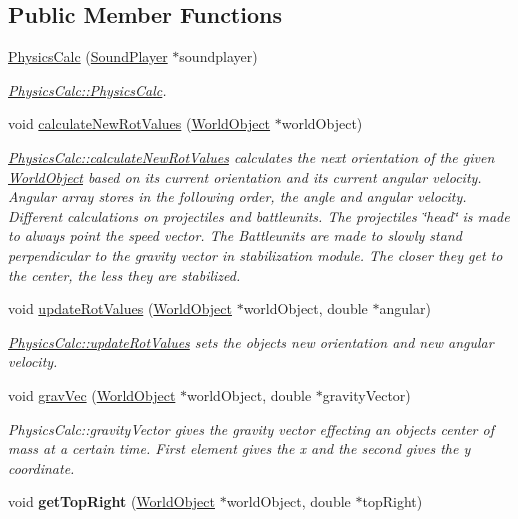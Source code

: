 \subsection*{Public Member Functions}
\begin{DoxyCompactItemize}
\item 
\hyperlink{class_physics_calc_a806b2675198437e8271ab82eda0e6746}{Physics\+Calc} (\hyperlink{class_sound_player}{Sound\+Player} $\ast$soundplayer)
\begin{DoxyCompactList}\small\item\em \hyperlink{class_physics_calc_a806b2675198437e8271ab82eda0e6746}{Physics\+Calc\+::\+Physics\+Calc}. \end{DoxyCompactList}\item 
void \hyperlink{class_physics_calc_a7ef2a6c520d3d0a815c333c1a08cb4df}{calculate\+New\+Rot\+Values} (\hyperlink{class_world_object}{World\+Object} $\ast$world\+Object)
\begin{DoxyCompactList}\small\item\em \hyperlink{class_physics_calc_a7ef2a6c520d3d0a815c333c1a08cb4df}{Physics\+Calc\+::calculate\+New\+Rot\+Values} calculates the next orientation of the given \hyperlink{class_world_object}{World\+Object} based on it\textquotesingle{}s current orientation and its current angular velocity. Angular array stores in the following order, the angle and angular velocity. Different calculations on projectiles and battleunits. The projectiles \char`\"{}head\char`\"{} is made to always point the speed vector. The Battleunits are made to slowly stand perpendicular to the gravity vector in stabilization module. The closer they get to the center, the less they are stabilized. \end{DoxyCompactList}\item 
void \hyperlink{class_physics_calc_afaa9837f796074797ea731066f09dfc3}{update\+Rot\+Values} (\hyperlink{class_world_object}{World\+Object} $\ast$world\+Object, double $\ast$angular)
\begin{DoxyCompactList}\small\item\em \hyperlink{class_physics_calc_afaa9837f796074797ea731066f09dfc3}{Physics\+Calc\+::update\+Rot\+Values} sets the objects new orientation and new angular velocity. \end{DoxyCompactList}\item 
void \hyperlink{class_physics_calc_ad1eaa72eeff1b031b08db33730d8decb}{grav\+Vec} (\hyperlink{class_world_object}{World\+Object} $\ast$world\+Object, double $\ast$gravity\+Vector)
\begin{DoxyCompactList}\small\item\em Physics\+Calc\+::gravity\+Vector gives the gravity vector effecting an objects center of mass at a certain time. First element gives the x and the second gives the y coordinate. \end{DoxyCompactList}\item 
void {\bfseries get\+Top\+Right} (\hyperlink{class_world_object}{World\+Object} $\ast$world\+Object, double $\ast$top\+Right)\hypertarget{class_physics_calc_af23c90f3041fe0b8be343ef2a35245d2}{}\label{class_physics_calc_af23c90f3041fe0b8be343ef2a35245d2}


\end{DoxyCompactItemize}
